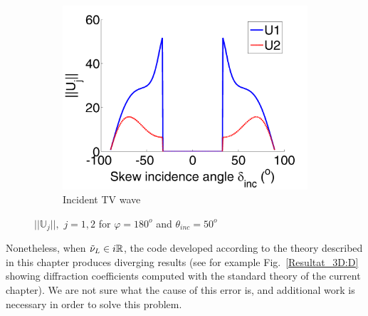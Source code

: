 \begin{figure}[h]
\begin{subfigure}[b]{0.32\textwidth}
        \includegraphics[width=\textwidth]{images/chapter4/Resultats_3D/U1TV_180_50.png}
        \caption{Incident TV wave}
        \label{Resultat_3D:U1TV}
    \end{subfigure} 
\caption{$||\mathbb{U}_j||, \, \, j=1,2$ for $\varphi=180^o$ and $\theta_{inc}=50^o$}
\label{Resultat_3D:U1}
\end{figure}

Nonetheless, when $\tilde{\nu}_L \in i\mathbb{R}$, the code developed according to the theory described in this chapter produces diverging results (see for example Fig.~\ref{Resultat_3D:D} showing diffraction coefficients computed with the standard theory of the current chapter). We are not sure what the cause of this error is, and additional work is necessary in order to solve this problem.


